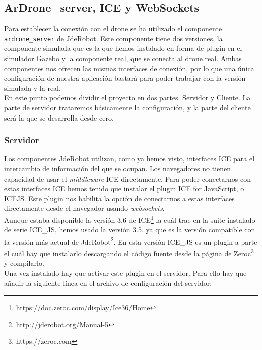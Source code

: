 \subsection{ArDrone\_server, ICE y WebSockets}\label{subsec:ardrone}

Para establecer la conexión con el drone se ha utilizado el componente \texttt{ardrone\_server} de JdeRobot. Este componente tiene dos versiones, la componente simulada que es la que hemos instalado en forma de plugin en el simulador Gazebo y la componente real, que se conecta al drone real. Ambas componentes nos ofrecen las mismas interfaces de conexión, por lo que una única configuración de nuestra aplicación bastará para poder trabajar con la versión simulada y la real.\\

En este punto podemos dividir el proyecto en dos partes. Servidor y Cliente. La parte de servidor trataremos básicamente la configuración, y la parte del cliente será la que se desarrolla desde cero.\\

\subsubsection{Servidor}

Los componentes JdeRobot utilizan, como ya hemos visto, interfaces ICE para el intercambio de información del que se ocupan. Los navegadores no tienen capacidad de usar el \emph{middleware} ICE directamente. Para poder conectarnos con estas interfaces ICE hemos tenido que instalar el plugin ICE for JavaScript, o ICE\-JS. Este plugin nos habilita la opción de conectarnos a estas interfaces directamente desde el navegador usando \emph{websockets}.\\

Aunque estaba disponible la versión 3.6 de ICE\footnote{https://doc.zeroc.com/display/Ice36/Home} la cuál trae en la suite instalado de serie ICE\_JS, hemos usado la versión 3.5, ya que es la versión compatible con la versión más actual de JdeRobot\footnote{http://jderobot.org/Manual-5}. En esta versión ICE\_JS es un plugin a parte el cuál hay que instalarlo descargando el código fuente desde la página de Zeroc\footnote{https://zeroc.com} y compilarlo.\\

Una vez instalado hay que activar este plugin en el servidor. Para ello hay que añadir la siguiente línea en el archivo de configuración del servidor:\\

